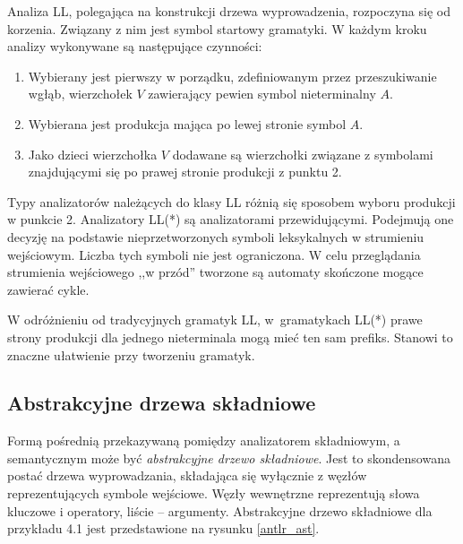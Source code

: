 Analiza LL, polegająca na konstrukcji drzewa %
wyprowadzenia, rozpoczyna się od korzenia. Związany z nim jest symbol 
startowy gramatyki. W każdym kroku analizy wykonywane są następujące czynności:
\begin{enumerate}
\item Wybierany jest pierwszy w porządku, zdefiniowanym przez
  przeszukiwanie wgłąb, wierzchołek $V$ zawierający pewien symbol nieterminalny $A$. %
\item Wybierana jest produkcja mająca po lewej stronie symbol $A$.
\item Jako dzieci wierzchołka $V$ dodawane są wierzchołki związane z symbolami znajdującymi się po prawej
  stronie produkcji z punktu 2.
\end{enumerate}

Typy analizatorów należących do klasy LL różnią się sposobem wyboru produkcji w punkcie 2. 
Analizatory LL(*) są analizatorami przewidującymi. Podejmują one decyzję na
podstawie nieprzetworzonych symboli leksykalnych w strumieniu wejściowym. Liczba
tych symboli nie jest ograniczona. W celu przeglądania strumienia wejściowego 
,,w przód'' tworzone są automaty skończone mogące zawierać cykle.

W odróżnieniu od tradycyjnych gramatyk LL, w~gramatykach LL(*) prawe strony
produkcji dla jednego nieterminala mogą mieć ten sam prefiks.
Stanowi to znaczne ułatwienie przy tworzeniu gramatyk. 

\subsection{Abstrakcyjne drzewa składniowe}

Formą pośrednią przekazywaną pomiędzy analizatorem składniowym, a semantycznym
może być \emph{abstrakcyjne drzewo składniowe}. Jest to skondensowana postać drzewa
wyprowadzania, składająca się
wyłącznie z węzłów reprezentujących symbole wejściowe. Węzły
wewnętrzne reprezentują słowa kluczowe i operatory, liście -- argumenty.
Abstrakcyjne drzewo składniowe dla przykładu 4.1 jest przedstawione na rysunku 
\ref{antlr_ast}. %

